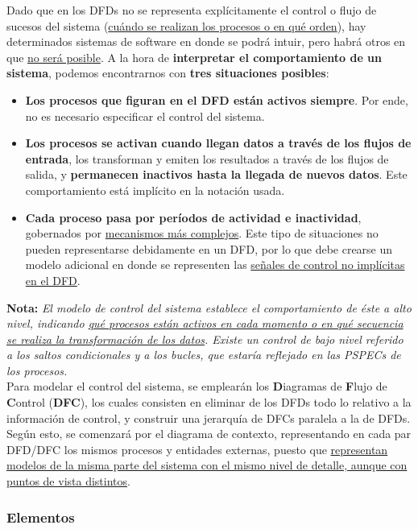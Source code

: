 Dado que en los DFDs no se representa explícitamente el control o flujo de sucesos del sistema (\uline{cuándo se realizan los procesos o en qué orden}), hay determinados sistemas de software en donde se podrá intuir, pero habrá otros en que \uline{no será posible}. A la hora de \textbf{interpretar el comportamiento de un sistema}, podemos encontrarnos con \textbf{tres situaciones posibles}:

\begin{itemize}
    \item \textbf{Los procesos que figuran en el DFD están activos siempre}. Por ende, no es necesario especificar el control del sistema.
    \item \textbf{Los procesos se activan cuando llegan datos a través de los flujos de entrada}, los transforman y emiten los resultados a través de los flujos de salida, y \textbf{permanecen inactivos hasta la llegada de nuevos datos}. Este comportamiento está implícito en la notación usada.
    \item \textbf{Cada proceso pasa por períodos de actividad e inactividad}, gobernados por \uline{mecanismos más complejos}. Este tipo de situaciones no pueden representarse debidamente en un DFD, por lo que debe crearse un modelo adicional en donde se representen las \uline{señales de control no implícitas en el DFD}.
\end{itemize}

\textbf{Nota:} \textit{El modelo de control del sistema establece el comportamiento de éste a alto nivel, indicando \uline{qué procesos están activos en cada momento o en qué secuencia se realiza la transformación de los datos}. Existe un control de bajo nivel referido a los saltos condicionales y a los bucles, que estaría reflejado en las PSPECs de los procesos.}\\

Para modelar el control del sistema, se emplearán los \textbf{D}iagramas de \textbf{F}lujo de \textbf{C}ontrol (\textbf{DFC}), los cuales consisten en eliminar de los DFDs todo lo relativo a la información de control, y construir una jerarquía de DFCs paralela a la de DFDs. Según esto, se comenzará por el diagrama de contexto, representando en cada par DFD/DFC los mismos procesos y entidades externas, puesto que \uline{representan modelos de la misma parte del sistema con el mismo nivel de detalle, aunque con puntos de vista distintos}.\\

\subsubsection{Elementos}

